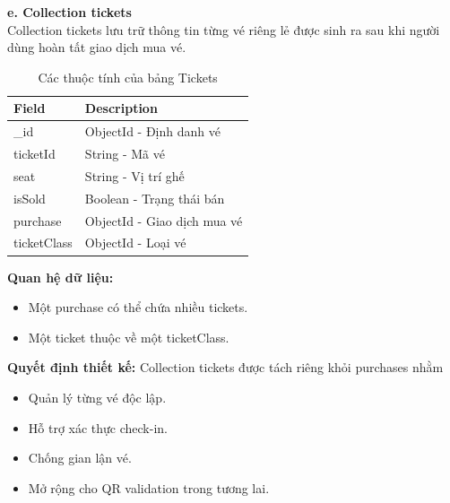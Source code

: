 \textbf{e. Collection tickets}\\
Collection tickets lưu trữ thông tin từng vé riêng lẻ được sinh ra sau khi người dùng hoàn tất giao dịch mua vé.
\setlength{\LTleft}{0pt}
\setlength{\LTright}{0pt}
\begin{longtable}{|p{4cm}|p{11.2cm}|}
\caption{Các thuộc tính của bảng Tickets}\\[15pt]
\hline
\textbf{Field} & \textbf{Description} \\ \hline
\_id & ObjectId - Định danh vé \\ \hline
ticketId & String - Mã vé \\ \hline
seat & String - Vị trí ghế \\ \hline
isSold & Boolean - Trạng thái bán \\ \hline
purchase & ObjectId - Giao dịch mua vé \\ \hline
ticketClass & ObjectId - Loại vé \\ \hline
\end{longtable}
\textbf{Quan hệ dữ liệu:}
\begin{itemize}
    \item[-] Một purchase có thể chứa nhiều tickets.
    \item[-] Một ticket thuộc về một ticketClass.
\end{itemize}
\textbf{Quyết định thiết kế:} Collection tickets được tách riêng khỏi purchases nhằm
\begin{itemize}
    \item[-] Quản lý từng vé độc lập.
    \item[-] Hỗ trợ xác thực check-in.
    \item[-] Chống gian lận vé.
    \item[-] Mở rộng cho QR validation trong tương lai.
\end{itemize}

